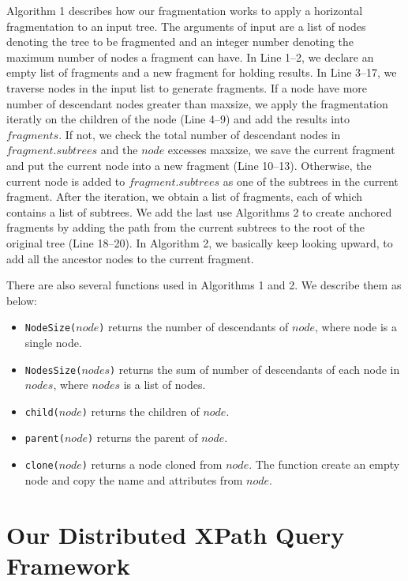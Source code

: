   
Algorithm 1 describes how our fragmentation works to apply a horizontal
fragmentation to an input tree. The arguments of input are a list of nodes
denoting the tree to be fragmented and an integer number denoting the maximum
number of nodes a fragment can have.  In Line 1--2, we declare an empty list of
fragments and a new fragment for holding results. In Line 3--17, we traverse
nodes in the input list to generate fragments. If a node have more number of
descendant nodes greater than maxsize, we apply the fragmentation iteratly on
the children of the node (Line 4--9) and add the results into $fragments$. If
not, we check the total number of descendant nodes in $fragment.subtrees$ and
the $node$ excesses maxsize, we save the current fragment and put the current
node into a new fragment (Line 10--13). Otherwise, the current node is added to
$fragment.subtrees$ as one of the subtrees in the current fragment. After the
iteration, we obtain a list of fragments, each of which contains a list of
subtrees. We add the last use Algorithms 2 to create anchored fragments by
adding the path from the current subtrees to the root of the original tree (Line
18--20). In Algorithm 2, we basically keep looking upward, to add all the
ancestor nodes to the current fragment.




There are also several functions used in Algorithms 1 and 2. We describe 
them as below:

\begin{itemize}
	\item \texttt{NodeSize($node$)} returns the number of descendants of $node$, 
	where node is a single node. 
	\item \texttt{NodesSize($nodes$)} returns the sum of number of descendants 
	of each node in $nodes$, where $nodes$ is a list of nodes. 
	\item \texttt{child($node$)} returns the children of $node$.
	\item \texttt{parent($node$)} returns the parent of $node$. 
	\item \texttt{clone($node$)} returns a node cloned from $node$. The function create
	an empty node and copy the name and attributes from $node$.
\end{itemize}








\section{Our Distributed XPath Query Framework}


